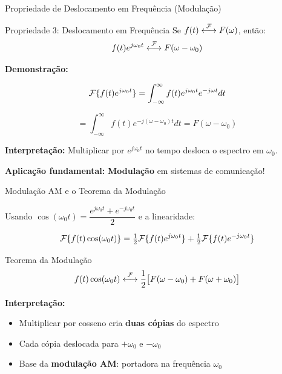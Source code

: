 \begin{frame}{Propriedade de Deslocamento em Frequência (Modulação)}

\begin{block}{Propriedade 3: Deslocamento em Frequência}
Se $f(t) \mathrel{\overset{\mathcal{F}}{\longleftrightarrow}} F(\omega)$, então:
\[
f(t) e^{j\omega_0 t} \mathrel{\overset{\mathcal{F}}{\longleftrightarrow}} F(\omega - \omega_0)
\]
\end{block}

\textbf{Demonstração:}

\[
\mathcal{F}\{f(t) e^{j\omega_0 t}\} = \int_{-\infty}^{\infty} f(t) e^{j\omega_0 t} e^{-j\omega t} dt
\]

\[
= \int_{-\infty}^{\infty} f(t) e^{-j(\omega - \omega_0) t} dt = F(\omega - \omega_0)
\]

\textbf{Interpretação:} Multiplicar por $e^{j\omega_0 t}$ no tempo desloca o espectro em $\omega_0$.

\textbf{Aplicação fundamental:} \textbf{Modulação} em sistemas de comunicação!

\end{frame}


\begin{frame}{Modulação AM e o Teorema da Modulação}

Usando $\cos(\omega_0 t) = \dfrac{e^{j\omega_0 t} + e^{-j\omega_0 t}}{2}$ e a linearidade:

\[
\mathcal{F}\{f(t) \cos(\omega_0 t)\}
= \tfrac{1}{2}\mathcal{F}\{f(t)e^{j\omega_0 t}\} + \tfrac{1}{2}\mathcal{F}\{f(t)e^{-j\omega_0 t}\}
\]

\begin{block}{Teorema da Modulação}
\[
f(t) \cos(\omega_0 t) \mathrel{\overset{\mathcal{F}}{\longleftrightarrow}} \frac{1}{2}\bigl[F(\omega - \omega_0) + F(\omega + \omega_0)\bigr]
\]
\end{block}

\textbf{Interpretação:}
\begin{itemize}
\item Multiplicar por cosseno cria \textbf{duas cópias} do espectro
\item Cada cópia deslocada para $+\omega_0$ e $-\omega_0$
\item Base da \textbf{modulação AM}: portadora na frequência $\omega_0$
\end{itemize}

\end{frame}


